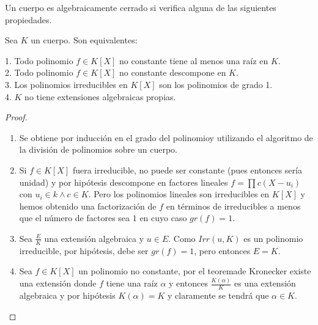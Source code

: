 \begin{definition}
Un cuerpo es algebraicamente cerrado si verifica alguna de las siguientes propiedades.
\end{definition}

\begin{proposition}
	Sea $K$ un cuerpo. Son equivalentes:
	
	1. Todo polinomio $f \in K[X]$ no constante tiene al menos una raíz en $K$.\\
	2. Todo polinomio $f \in K[X]$ no constante descompone en $K$. \\
	3. Los polinomios irreducibles en $K[X]$ son los polinomios de grado 1. \\
	4. $K$ no tiene extensiones algebraicas propias. 
\end{proposition}
\begin{proof}
\begin{enumerate}
\item Se obtiene por inducción en el grado del polinomioy utilizando el algoritmo de la división de polinomios sobre un cuerpo.
\item Si $f \in K[X]$ fuera irreducible, no puede ser constante (pues entonces sería unidad) y por hipótesis descompone en factores lineales $f = \prod c(X-u_i)$ con $u_i \in k \land c \in K$. Pero los polinomios lineales son irreducibles en $K[X]$ y hemos obtenido una factorización de $f$ en términos de irreducibles a menos que el número de factores sea $1$ en cuyo caso $gr(f) = 1$. 
\item Sea $\frac{E}{K}$ una extensión algebraica y $u \in E$. Como $Irr(u,K)$ es un polinomio irreducible, por hipótesis, debe ser $gr(f) = 1$, pero entonces $E = K$. 
\item Sea $f \in K[X]$ un polinomio no constante, por el teoremade Kronecker existe una extensión donde $f$ tiene una raíz $\alpha$ y entonces $\frac{K(\alpha)}{K}$ es una extensión algebraica y por hipótesis $K(\alpha) = K$ y claramente se tendrá que $\alpha \in K$. 
\end{enumerate}
\end{proof}


